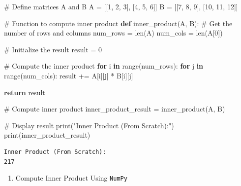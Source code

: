 \documentclass[
  letterpaper,
  DIV=11,
  numbers=noendperiod]{scrreprt}
\newenvironment{Shaded}{\begin{snugshade}}{\end{snugshade}}
\newcommand{\BuiltInTok}[1]{\textcolor[rgb]{0.00,0.23,0.31}{#1}}
\newcommand{\CommentTok}[1]{\textcolor[rgb]{0.37,0.37,0.37}{#1}}
\newcommand{\ControlFlowTok}[1]{\textcolor[rgb]{0.00,0.23,0.31}{\textbf{#1}}}
\newcommand{\DecValTok}[1]{\textcolor[rgb]{0.68,0.00,0.00}{#1}}
\newcommand{\KeywordTok}[1]{\textcolor[rgb]{0.00,0.23,0.31}{\textbf{#1}}}
\newcommand{\NormalTok}[1]{\textcolor[rgb]{0.00,0.23,0.31}{#1}}
\newcommand{\OperatorTok}[1]{\textcolor[rgb]{0.37,0.37,0.37}{#1}}
\newcommand{\StringTok}[1]{\textcolor[rgb]{0.13,0.47,0.30}{#1}}
\providecommand{\tightlist}{%
  \setlength{\itemsep}{0pt}\setlength{\parskip}{0pt}}\usepackage{longtable,booktabs,array}
\theoremstyle{plain}
\theoremstyle{definition}
\theoremstyle{remark}
\begin{document}
\begin{Shaded}
\begin{Highlighting}[]
\CommentTok{\# Define matrices A and B}
\NormalTok{A }\OperatorTok{=}\NormalTok{ [[}\DecValTok{1}\NormalTok{, }\DecValTok{2}\NormalTok{, }\DecValTok{3}\NormalTok{], [}\DecValTok{4}\NormalTok{, }\DecValTok{5}\NormalTok{, }\DecValTok{6}\NormalTok{]]}
\NormalTok{B }\OperatorTok{=}\NormalTok{ [[}\DecValTok{7}\NormalTok{, }\DecValTok{8}\NormalTok{, }\DecValTok{9}\NormalTok{], [}\DecValTok{10}\NormalTok{, }\DecValTok{11}\NormalTok{, }\DecValTok{12}\NormalTok{]]}

\CommentTok{\# Function to compute inner product}
\KeywordTok{def}\NormalTok{ inner\_product(A, B):}
    \CommentTok{\# Get the number of rows and columns}
\NormalTok{    num\_rows }\OperatorTok{=} \BuiltInTok{len}\NormalTok{(A)}
\NormalTok{    num\_cols }\OperatorTok{=} \BuiltInTok{len}\NormalTok{(A[}\DecValTok{0}\NormalTok{])}
    
    \CommentTok{\# Initialize the result}
\NormalTok{    result }\OperatorTok{=} \DecValTok{0}
    
    \CommentTok{\# Compute the inner product}
    \ControlFlowTok{for}\NormalTok{ i }\KeywordTok{in} \BuiltInTok{range}\NormalTok{(num\_rows):}
        \ControlFlowTok{for}\NormalTok{ j }\KeywordTok{in} \BuiltInTok{range}\NormalTok{(num\_cols):}
\NormalTok{            result }\OperatorTok{+=}\NormalTok{ A[i][j] }\OperatorTok{*}\NormalTok{ B[i][j]}
    
    \ControlFlowTok{return}\NormalTok{ result}

\CommentTok{\# Compute inner product}
\NormalTok{inner\_product\_result }\OperatorTok{=}\NormalTok{ inner\_product(A, B)}

\CommentTok{\# Display result}
\BuiltInTok{print}\NormalTok{(}\StringTok{"Inner Product (From Scratch):"}\NormalTok{)}
\BuiltInTok{print}\NormalTok{(inner\_product\_result)}
\end{Highlighting}
\end{Shaded}

\begin{verbatim}
Inner Product (From Scratch):
217
\end{verbatim}

\begin{enumerate}
\def\labelenumi{\arabic{enumi}.}
\setcounter{enumi}{1}
\tightlist
\item
  Compute Inner Product Using \texttt{NumPy}
\end{enumerate}
\end{document}

